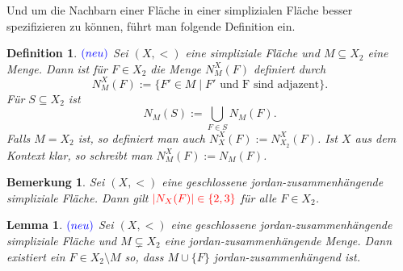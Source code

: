\documentclass[12pt,titlepage]{article}
\newtheorem{lemma}{Lemma}
\newtheorem{definition}{Definition}[section]
\newtheorem{bemerkung}{Bemerkung}[section]
\begin{document}
Und um die Nachbarn einer Fläche in einer simplizialen Fläche besser spezifizieren zu können, führt man folgende Definition ein.
\begin{definition} $\textcolor{blue}{(neu)}$ 
Sei $(X,<)$ eine simpliziale Fläche und $M \subseteq X_2$ eine Menge. Dann ist für $F \in X_2$ die Menge $N_M^X(F)$ definiert durch
\[
N_M^X(F):=\{ F' \in M \mid F'\text{ und F sind adjazent}\} .
\]
Für $S \subseteq X_2$ ist 
\[
N_M(S):=\bigcup_{F\in S}N_M(F).
\]
Falls $M=X_2$ ist, so definiert man auch $N_X^X(F):=N^X_{X_2}(F)$. Ist $X$ aus dem Kontext klar, so schreibt man $N_M^X(F):=N_M(F)$.
\end{definition}
\begin{bemerkung}
Sei $(X,<)$ eine geschlossene jordan-zusammenhängende simpliziale Fläche. Dann gilt $\textcolor{red}{\vert N_X(F)\vert \in \{2,3\}}$ für alle $F\in X_2$.
\end{bemerkung}
\begin{lemma} \label{lemma1} $\textcolor{blue}{(neu)}$
Sei $(X,<)$  eine geschlossene jordan-zusammenhängende simpliziale Fläche und $M \subsetneq X_2$ eine jordan-zusammenhängende Menge. Dann existiert ein $F\in X_2\setminus M$ so, dass $M \cup \{F\}$ jordan-zusammenhängend ist.
\end{lemma}
\end{document}

